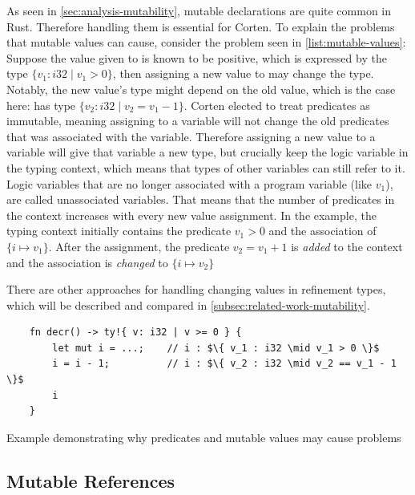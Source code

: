 \documentclass[twoside, english]{sdqthesis}
\theoremstyle{definition}
\begin{document}
As seen in \cref{sec:analysis-mutability}, mutable declarations are quite common in Rust. Therefore handling them is essential for Corten.
To explain the problems that mutable values can cause, consider the problem seen in \cref{list:mutable-values}: Suppose the value given to  is known to be positive, which is expressed by the type $\{ v_1 : i32 \mid v_1 > 0\}$, then assigning a new value to  may change the type. Notably, the new value's type might depend on the old value, which is the case here:  has type $\{ v_2 : i32 \mid v_2 = v_1 - 1\}$.
Corten elected to treat predicates as immutable, meaning assigning to a variable will not change the old predicates that was associated with the variable.
Therefore assigning a new value to a variable will give that variable a new type, but \- crucially \- keep the logic variable in the typing context, which means that types of other variables can still refer to it. Logic variables that are no longer associated with a program variable (like $v_1$), are called unassociated variables.
That means that the number of predicates in the context increases with every new value assignment.
In the example, the typing context initially contains the predicate $v_1 > 0$ and the association of $\{i \mapsto v_1\}$. After the assignment, the predicate $v_2 = v_1 + 1$ is \textit{added} to the context and the association is \textit{changed} to $\{i \mapsto v_2\}$

There are other approaches for handling changing values in refinement types, which will be described and compared in \ref{subsec:related-work-mutability}.


\begin{listing}[ht]
  \begin{verbatim}
    fn decr() -> ty!{ v: i32 | v >= 0 } {
        let mut i = ...;    // i : $\{ v_1 : i32 \mid v_1 > 0 \}$
        i = i - 1;          // i : $\{ v_2 : i32 \mid v_2 == v_1 - 1 \}$
        i
    }
  \end{verbatim}
  \caption{Example demonstrating why predicates and mutable values may cause problems}
  \label{lst:mutable-values}
\end{listing}

\subsection{Mutable References}\label{subsec:mutable-references}
\end{document}
